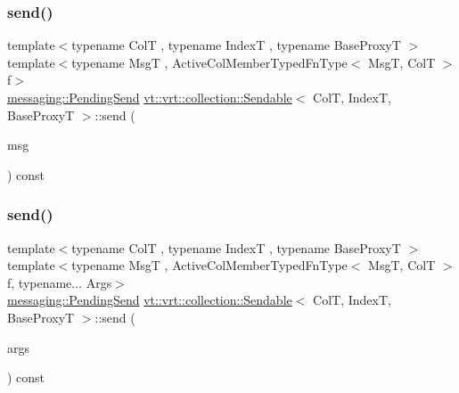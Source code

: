 \mbox{\label{structvt_1_1vrt_1_1collection_1_1_sendable_aa8c102820895d01422c14e8c0993fc90}} 
\subsubsection{\texorpdfstring{send()}{send()}\hspace{0.1cm}{\footnotesize\ttfamily [2/7]}}
{\footnotesize\ttfamily template$<$typename ColT , typename IndexT , typename Base\+ProxyT $>$ \\
template$<$typename MsgT , Active\+Col\+Member\+Typed\+Fn\+Type$<$ Msg\+T, Col\+T $>$ f$>$ \\
\hyperlink{structvt_1_1messaging_1_1_pending_send}{messaging\+::\+Pending\+Send} \hyperlink{structvt_1_1vrt_1_1collection_1_1_sendable}{vt\+::vrt\+::collection\+::\+Sendable}$<$ ColT, IndexT, Base\+ProxyT $>$\+::send (\begin{DoxyParamCaption}\item[{\hyperlink{namespacevt_ab2b3d506ec8e8d1540aede826d84a239}{Msg\+Shared\+Ptr}$<$ MsgT $>$}]{msg }\end{DoxyParamCaption}) const}

\mbox{\label{structvt_1_1vrt_1_1collection_1_1_sendable_a65e5494a18b398b52f12c056cff1dc16}} 
\subsubsection{\texorpdfstring{send()}{send()}\hspace{0.1cm}{\footnotesize\ttfamily [3/7]}}
{\footnotesize\ttfamily template$<$typename ColT , typename IndexT , typename Base\+ProxyT $>$ \\
template$<$typename MsgT , Active\+Col\+Member\+Typed\+Fn\+Type$<$ Msg\+T, Col\+T $>$ f, typename... Args$>$ \\
\hyperlink{structvt_1_1messaging_1_1_pending_send}{messaging\+::\+Pending\+Send} \hyperlink{structvt_1_1vrt_1_1collection_1_1_sendable}{vt\+::vrt\+::collection\+::\+Sendable}$<$ ColT, IndexT, Base\+ProxyT $>$\+::send (\begin{DoxyParamCaption}\item[{Args \&\&...}]{args }\end{DoxyParamCaption}) const}




